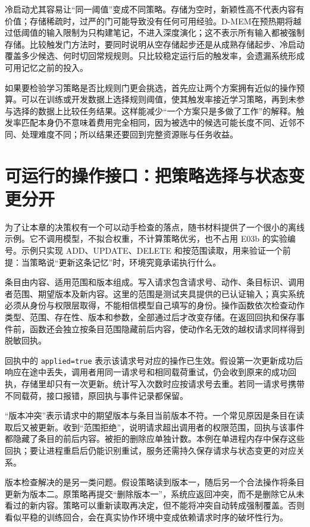 冷启动尤其容易让“同一阈值”变成不同策略。存储为空时，新颖性高不代表内容有价值；存储稀疏时，过严的门可能导致没有任何可用经验。D-MEM在预热期将越过低阈值的输入限制为只构建笔记，不进入深度演化；这不表示所有输入都被强制存储\cite{dmem-2603}。比较触发门方法时，要同时说明从空存储起步还是从成熟存储起步、冷启动覆盖多少候选、何时切回常规规则。只比较稳定运行后的触发率，会遗漏系统形成可用记忆之前的投入。

如果要检验学习策略是否比规则门更会挑选，首先应让两个方案拥有近似的操作预算。可以在训练或开发数据上选择规则阈值，使其触发率接近学习策略，再到未参与选择的数据上比较任务结果。这样能减少“一个方案只是多做了工作”的解释。触发率匹配本身仍不意味着费用完全相同，因为被选中的候选可能长度不同、近邻不同、处理难度不同；所以结果还要回到完整资源账与任务收益。

\section{可运行的操作接口：把策略选择与状态变更分开}
\label{sec:ch06-interface}

为了让本章的决策权有一个可以动手检查的落点，随书材料提供了一个很小的离线示例。它不调用模型，不拟合权重，不计算策略优劣，也不占用 E03b 的实验编号。示例只实现 ADD、UPDATE、DELETE 和按范围读取，用来验证一个前提：当策略说“更新这条记忆”时，环境究竟承诺执行什么。

条目由内容、适用范围和版本组成。写入请求包含请求号、动作、条目标识、调用者范围、期望版本及新内容。这里的范围是测试夹具提供的已认证输入；真实系统必须从身份与权限层取得，不能相信模型自己填写的身份。操作函数依次检查动作类型、范围、存在性、版本和参数，全部通过后才改变存储。在返回回执和保存事件前，函数还会独立按条目范围隐藏前后内容，使动作名无效的越权请求同样得到脱敏回执。

回执中的 \texttt{applied=true} 表示该请求号对应的操作已生效。假设第一次更新成功后响应在途中丢失，调用者用同一请求号和相同载荷重试，仍会收到原来的成功回执，存储里却只有一次更新。统计写入次数时应按请求号去重。若同一请求号携带不同载荷，接口报错，原回执与事件记录都保留。

“版本冲突”表示请求中的期望版本与条目当前版本不符。一个常见原因是条目在读取后又被更新。收到“范围拒绝”，说明请求超出调用者的权限范围，回执与该事件都隐藏了条目的前后内容。被拒的删除应单独计数。本例在单进程内存中保存这些回执；要让进程重启后仍能识别重试，服务还需持久保存请求与状态变更的对应关系。

版本检查解决的是另一类问题。假设策略读到版本一，随后另一个合法操作将条目更新为版本二。原策略再提交“删除版本一”，系统应返回冲突，而不是删除它从未看过的新内容。策略可以重新读取再决定，但不能将冲突自动转成强制覆盖。否则看似平稳的训练回合，会在真实协作环境中变成依赖请求时序的破坏性行为。

